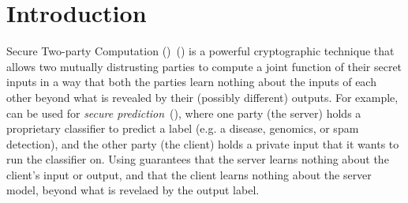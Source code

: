   
  

\section{Introduction}
\label{sec:intro}





Secure Two-party Computation (\mpc)~(\cite{yao,gmw}) is a powerful
cryptographic technique that allows two mutually distrusting parties
to compute a joint function of their secret inputs in a way that both
the parties learn nothing about the inputs of each other beyond what
is revealed by their (possibly different) outputs. For example, \mpc
can be used for {\em secure
prediction}~(\cite{shafindss,wu,barni,minionn,secureml}),
where one party (the server) holds a proprietary classifier to predict
a label (e.g. a disease, genomics, or spam detection), and the other
party (the client) holds a private input that it wants to run the
classifier on. Using \mpc guarantees that the server learns nothing
about the client's input or output, and that the client learns nothing
about the server model, beyond what is revelaed by the output
label.

